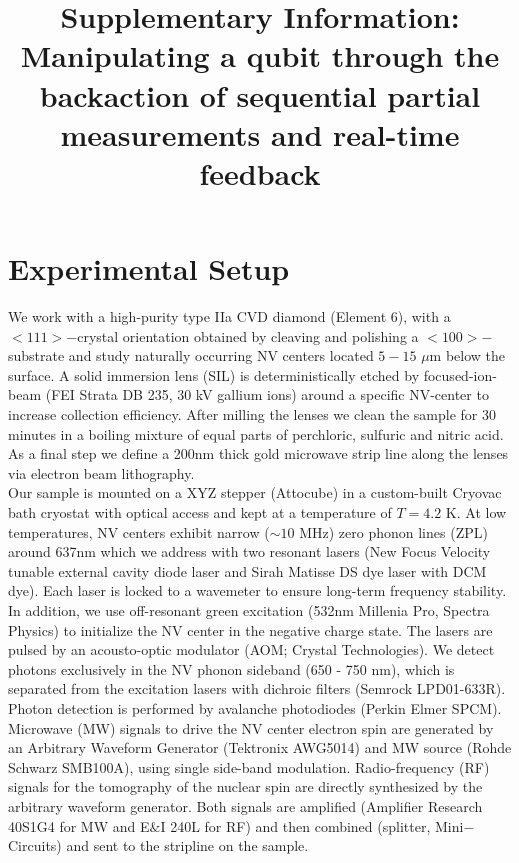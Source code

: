 \documentclass[12pt]{article}
\begin{document}
\sffamily
\title {Supplementary Information: \\Manipulating a qubit through the backaction of sequential partial measurements and real-time feedback  }

\date{}
\maketitle

\tableofcontents

\newpage
\section {Experimental Setup}

We work with a high-purity type IIa CVD diamond (Element 6), with a $<111>-$crystal orientation obtained by cleaving and polishing a $<100>-$substrate and study naturally occurring NV centers located $5-15$ $\mu$m below the surface. A solid immersion lens (SIL) is deterministically etched by focused-ion-beam (FEI Strata DB 235, 30 kV gallium ions) around a specific NV-center to increase collection efficiency. After milling the lenses we clean the sample for 30 minutes in a boiling mixture of equal parts of perchloric, sulfuric and nitric acid. As a final step we define a 200nm thick gold microwave strip line along the lenses via electron beam lithography.\\
Our sample is mounted on a XYZ stepper (Attocube) in a custom-built Cryovac bath cryostat with optical access and kept at a temperature of $T = 4.2$ K. At low temperatures, NV centers exhibit narrow ($\sim 10$ MHz) zero phonon lines (ZPL) around 637nm which we address with two resonant lasers (New Focus Velocity tunable external cavity diode laser and Sirah Matisse DS dye laser with DCM dye). Each laser is locked to a wavemeter to ensure long-term frequency stability. In addition, we use off-resonant green excitation (532nm Millenia Pro, Spectra Physics) to initialize the NV center in the negative charge state. The lasers are pulsed by an acousto-optic modulator (AOM; Crystal Technologies).
We detect photons exclusively in the NV phonon sideband (650 - 750 nm), which is separated from the excitation lasers with dichroic filters (Semrock LPD01-633R). Photon detection is performed by avalanche photodiodes (Perkin Elmer SPCM).\\
Microwave (MW) signals to drive the NV center electron spin are generated by an Arbitrary Waveform Generator (Tektronix AWG5014) and MW source (Rohde Schwarz SMB100A), using single side-band modulation. Radio-frequency (RF) signals for the tomography of the nuclear spin are directly synthesized by the arbitrary waveform generator. Both signals are amplified (Amplifier Research 40S1G4 for MW and E$\&$I 240L for RF) and then combined (splitter, Mini$-$Circuits) and sent to the stripline on the sample.\\
\end{document}
